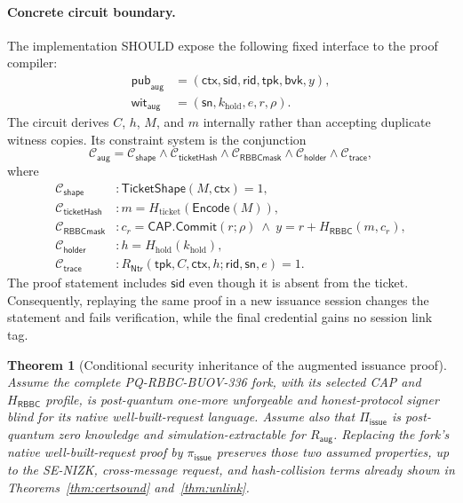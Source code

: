 \documentclass[11pt]{article}
\newtheorem{theorem}[definition]{Theorem}
\newcommand{\RBBC}{\mathsf{RBBC}}
\newcommand{\Piiss}{\Pi_{\mathsf{issue}}}
\newcommand{\rid}{\mathsf{rid}}
\newcommand{\sn}{\mathsf{sn}}
\newcommand{\ctx}{\mathsf{ctx}}
\begin{document}
\paragraph{Concrete circuit boundary.}
The implementation SHOULD expose the following fixed interface to the proof
compiler:
\begin{align*}
 \mathsf{pub}_{\mathsf{aug}}
   &= (\ctx,\mathsf{sid},\rid,\mathsf{tpk},\mathsf{bvk},y),\\
 \mathsf{wit}_{\mathsf{aug}}
   &= (\sn,k_{\mathrm{hold}},e,r,\rho).
\end{align*}
The circuit derives $C$, $h$, $M$, and $m$ internally rather than accepting
duplicate witness copies.  Its constraint system is the conjunction
\[
 \mathcal C_{\mathsf{aug}}=
 \mathcal C_{\mathsf{shape}}\wedge
 \mathcal C_{\mathsf{ticketHash}}\wedge
 \mathcal C_{\mathsf{RBBCmask}}\wedge
 \mathcal C_{\mathsf{holder}}\wedge
 \mathcal C_{\mathsf{trace}},
\]
where
\begin{align*}
 \mathcal C_{\mathsf{shape}} &: \mathsf{TicketShape}(M,\ctx)=1,\\
 \mathcal C_{\mathsf{ticketHash}} &: m=H_{\mathrm{ticket}}(\mathsf{Encode}(M)),\\
 \mathcal C_{\mathsf{RBBCmask}} &: c_r=\mathsf{CAP.Commit}(r;\rho)\ \wedge\
   y=r+H_{\RBBC}(m,c_r),\\
 \mathcal C_{\mathsf{holder}} &: h=H_{\mathrm{hold}}(k_{\mathrm{hold}}),\\
 \mathcal C_{\mathsf{trace}} &: R_{\mathsf{Ntr}}
   (\mathsf{tpk},C,\ctx,h;\rid,\sn,e)=1.
\end{align*}
The proof statement includes $\mathsf{sid}$ even though it is absent from the
ticket.  Consequently, replaying the same proof in a new issuance session
changes the statement and fails verification, while the final credential gains
no session link tag.

\begin{theorem}[Conditional security inheritance of the augmented issuance proof]\label{thm:augcap}
Assume the complete PQ-RBBC-BUOV-336 fork, with its selected CAP and
$H_{\RBBC}$ profile, is post-quantum one-more unforgeable and
honest-protocol signer blind for its native well-built-request language.
Assume also that $\Piiss$ is post-quantum zero knowledge and
simulation-extractable for $R_{\mathsf{aug}}$.  Replacing the fork's native
well-built-request proof by $\pi_{\mathsf{issue}}$ preserves those two assumed
properties, up to the SE-NIZK, cross-message request, and hash-collision terms
already shown in Theorems~\ref{thm:certsound} and~\ref{thm:unlink}.
\end{theorem}
\end{document}
